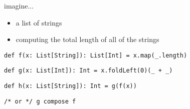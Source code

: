 \documentclass[include/preamble.tex]{subfiles}
\begin{document}
\begin{frame}[fragile]
  \begin{center}
    \begin{flushleft}
      imagine...
    \end{flushleft}
    \begin{itemize}
      \pause
    \item a list of strings
      \pause
    \item computing the total length of all of the strings
    \end{itemize}
  \end{center}
\end{frame}

\begin{frame}[fragile]
  \begin{center}
    \newline
    \newline
    \begin{flushleft}

      \begin{lrbox}{\boxA}
        \begin{lstlisting}[style=scala]
def f(x: List[String]): List[Int] = x.map(_.length)
        \end{lstlisting}
      \end{lrbox}

      \begin{lrbox}{\boxB}
        \begin{lstlisting}[style=scala]
def g(x: List[Int]): Int = x.foldLeft(0)(_ + _)
        \end{lstlisting}
      \end{lrbox}

      \begin{lrbox}{\boxC}
        \begin{lstlisting}[style=scala]
def h(x: List[String]): Int = g(f(x))
        \end{lstlisting}
      \end{lrbox}

      \begin{lrbox}{\boxD}
        \begin{lstlisting}[style=scala]
                     /* or */ g compose f
        \end{lstlisting}
      \end{lrbox}


\end{flushleft}
\end{center}
\end{frame}
\end{document}
